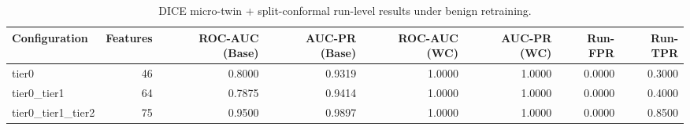 \begin{table}[t]
\centering
\caption{DICE micro-twin + split-conformal run-level results under benign retraining.}
\label{tab:dice_full_overall}
\footnotesize
\begin{tabular}{lrrrrrrr}
\toprule
Configuration & Features & ROC-AUC (Base) & AUC-PR (Base) & ROC-AUC (WC) & AUC-PR (WC) & Run-FPR & Run-TPR \\
\midrule
tier0 & 46 & 0.8000 & 0.9319 & 1.0000 & 1.0000 & 0.0000 & 0.3000 \\
tier0_tier1 & 64 & 0.7875 & 0.9414 & 1.0000 & 1.0000 & 0.0000 & 0.4000 \\
tier0_tier1_tier2 & 75 & 0.9500 & 0.9897 & 1.0000 & 1.0000 & 0.0000 & 0.8500 \\
\bottomrule
\end{tabular}

\end{table}
